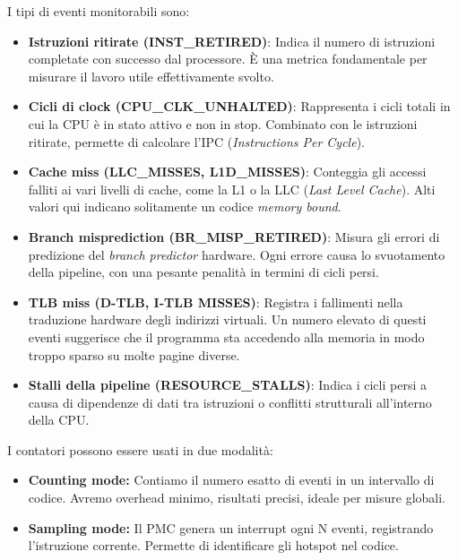 I tipi di eventi monitorabili sono:
\begin{itemize}
    \item \textbf{Istruzioni ritirate (INST\_RETIRED)}: Indica il numero di istruzioni completate con successo dal processore. È una metrica fondamentale per misurare il lavoro utile effettivamente svolto.
    \item \textbf{Cicli di clock (CPU\_CLK\_UNHALTED)}: Rappresenta i cicli totali in cui la CPU è in stato attivo e non in stop. Combinato con le istruzioni ritirate, permette di calcolare l'IPC (\textit{Instructions Per Cycle}).
    \item \textbf{Cache miss (LLC\_MISSES, L1D\_MISSES)}: Conteggia gli accessi falliti ai vari livelli di cache, come la L1 o la LLC (\textit{Last Level Cache}). Alti valori qui indicano solitamente un codice \textit{memory bound}.
    \item \textbf{Branch misprediction (BR\_MISP\_RETIRED)}: Misura gli errori di predizione del \textit{branch predictor} hardware. Ogni errore causa lo svuotamento della pipeline, con una pesante penalità in termini di cicli persi.
    \item \textbf{TLB miss (D-TLB, I-TLB MISSES)}: Registra i fallimenti nella traduzione hardware degli indirizzi virtuali. Un numero elevato di questi eventi suggerisce che il programma sta accedendo alla memoria in modo troppo sparso su molte pagine diverse.
    \item \textbf{Stalli della pipeline (RESOURCE\_STALLS)}: Indica i cicli persi a causa di dipendenze di dati tra istruzioni o conflitti strutturali all'interno della CPU.
\end{itemize}

I contatori possono essere usati in due modalità:
\begin{itemize}
    \item \textbf{Counting mode:} Contiamo il numero esatto di eventi in un intervallo di codice. Avremo overhead minimo, risultati precisi, ideale per misure globali.
    \item \textbf{Sampling mode:} Il PMC genera un interrupt ogni N eventi, registrando l'istruzione corrente. Permette di identificare gli hotspot nel codice.
\end{itemize}

